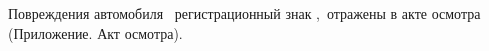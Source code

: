\indent Повреждения автомобиля \, регистрационный знак ,\,%
отражены в акте осмотра (Приложение. Акт осмотра).
%
